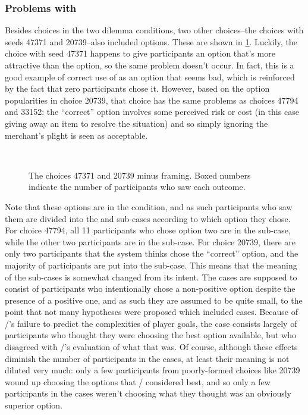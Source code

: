 \subsubsection{Problems with }


Besides choices in the two dilemma conditions, two other choices--the \obvs{} choices with seeds 47371 and 20739--also included  options.
%
These are shown in \cref{fig:e2-seeds-47371-20739}.
%
Luckily, the choice with seed 47371 happens to give participants an option that's more attractive than the  option, so the same problem doesn't occur.
%
In fact, this is a good example of correct use of  as an option that seems bad, which is reinforced by the fact that zero participants chose it.
%
However, based on the option popularities in choice 20739, that choice has the same problems as choices 47794 and 33152: the ``correct'' option involves some perceived risk or cost (in this case giving away an item to resolve the situation) and so simply ignoring the merchant's plight is seen as acceptable.


\begin{figure}[p]
 \\
\caption[``Obvious success'' choices 47371 and 20739]{The \obvs{} choices 47371 and 20739 minus framing. Boxed numbers indicate the number of participants who saw each outcome.}
\label{fig:e2-seeds-47371-20739}
\end{figure}


Note that these options are in the \obvs{} condition, and as such participants who saw them are divided into the \prq{[main]}{} and \prq{[alt]}{} sub-cases according to which option they chose.
%
For choice 47794, all 11 participants who chose option two are in the \prq{[main]}{} sub-case, while the other two participants are in the \prq{[alt]}{} sub-case.
%
For choice 20739, there are only two participants that the system thinks chose the ``correct'' option, and the majority of participants are put into the \prq{[alt]}{} sub-case.
%
This means that the meaning of the sub-cases is somewhat changed from its intent.
%
The \prq{[alt]}{} cases are supposed to consist of participants who intentionally chose a non-positive option despite the presence of a positive one, and as such they are assumed to be quite small, to the point that not many hypotheses were proposed which included \prq{[alt]}{} cases.
%
Because of \dunyazad/'s failure to predict the complexities of player goals, the \prq{[alt]}{} case consists largely of participants who thought they were choosing the best option available, but who disagreed with \dunyazad/'s evaluation of what that was.
%
Of course, although these effects diminish the number of participants in the \prq{[main]}{} cases, at least their meaning is not diluted very much: only a few participants from poorly-formed choices like 20739 wound up choosing the options that \dunyazad/ considered best, and so only a few participants in the \prq{[main]}{} cases weren't choosing what they thought was an obviously superior option.


